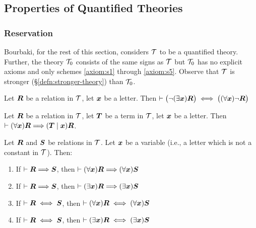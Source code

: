 \subsection{Properties of Quantified Theories}

\subsubsection{Reservation}
Bourbaki, for the rest of this section, considers $\mathcal{T}$ to be a
quantified theory. Further, the theory $\mathcal{T}_{0}$ consists of the
same signs as $\mathcal{T}$ but $\mathcal{T}_{0}$ has no explicit axioms
and only schemes \ref{axiom:s1} through \ref{axiom:s5}. Observe that
$\mathcal{T}$ is stronger (\S\ref{defn:stronger-theory}) than $\mathcal{T}_{0}$.

\begin{dc}\label{c29}
Let $\boldsymbol{R}$ be a relation in $\mathcal{T}$, let
$\boldsymbol{x}$ be a letter. Then $\vdash\bigl(\neg(\exists\boldsymbol{x})\boldsymbol{R}\bigr)\iff\bigl((\forall\boldsymbol{x})\neg\boldsymbol{R}\bigr)$
\end{dc}

\begin{dc}\label{c30}
Let $\boldsymbol{R}$ be a relation in $\mathcal{T}$, let
$\boldsymbol{T}$ be a term in $\mathcal{T}$, let $\boldsymbol{x}$ be
a letter. Then $\vdash(\forall\boldsymbol{x})\boldsymbol{R}\Longrightarrow(\boldsymbol{T}\mid\boldsymbol{x})\boldsymbol{R}$.
\end{dc}

\begin{dc}\label{c31}
Let $\boldsymbol{R}$ and $\boldsymbol{S}$ be relations in $\mathcal{T}$.
Let $\boldsymbol{x}$ be a variable (i.e., a letter which is not a
constant in $\mathcal{T}$). Then:
\begin{enumerate}
\item If $\vdash\boldsymbol{R}\Longrightarrow\boldsymbol{S}$, then $\vdash(\forall\boldsymbol{x})\boldsymbol{R}\Longrightarrow(\forall\boldsymbol{x})\boldsymbol{S}$
\item If $\vdash\boldsymbol{R}\Longrightarrow\boldsymbol{S}$, then $\vdash(\exists\boldsymbol{x})\boldsymbol{R}\Longrightarrow(\exists\boldsymbol{x})\boldsymbol{S}$
\item If $\vdash\boldsymbol{R}\iff\boldsymbol{S}$, then $\vdash(\forall\boldsymbol{x})\boldsymbol{R}\iff(\forall\boldsymbol{x})\boldsymbol{S}$
\item If $\vdash\boldsymbol{R}\iff\boldsymbol{S}$, then $\vdash(\exists\boldsymbol{x})\boldsymbol{R}\iff(\exists\boldsymbol{x})\boldsymbol{S}$
\end{enumerate}
\end{dc}


